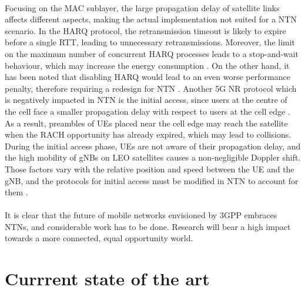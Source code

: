 \paragraph{} Focusing on the \ac{MAC} sublayer, the large propagation delay of satellite links affects different aspects, making the actual implementation not suited for a \ac{NTN} scenario. In the \ac{HARQ} protocol, the retransmission timeout is likely to expire before a single \ac{RTT}, leading to unnecessary retransmissions. Moreover, the limit on the maximum number of concurrent \ac{HARQ} processes leads to a stop-and-wait behaviour, which may increase the energy consumption \cite{3gpp-tr-38.811}. On the other hand, it has been noted that disabling \ac{HARQ} would lead to an even worse performance penalty, therefore requiring a redesign for \ac{NTN} \cite{5g-beyond-5g-ntn-trends-vanellicoralli}. Another 5G \ac{NR} protocol which is negatively impacted in \ac{NTN} is the initial access, since users at the centre of the cell face a smaller propagation delay with respect to users at the cell edge \cite{5g-beyond-5g-ntn-trends-vanellicoralli} \cite{applying-nr-technologies-in-ntn-lee}. As a result, preambles of \ac{UE}s placed near the cell edge may reach the satellite when the \ac{RACH} opportunity has already expired, which may lead to collisions. During the initial access phase, \ac{UE}s are not aware of their propagation delay, and the high mobility of \ac{gNB}s on \ac{LEO} satellites causes a non-negligible Doppler shift. Those factors vary with the relative position and speed between the \ac{UE} and the \ac{gNB}, and the protocols for initial access must be modified in \ac{NTN} to account for them \cite{ntn-from-5g-6g-hassan}. 
\paragraph{}
It is clear that the future of mobile networks envisioned by \ac{3GPP} embraces \ac{NTN}s, and considerable work has to be done. Research will bear a high impact towards a more connected, equal opportunity world. 

\section{Currrent state of the art}
